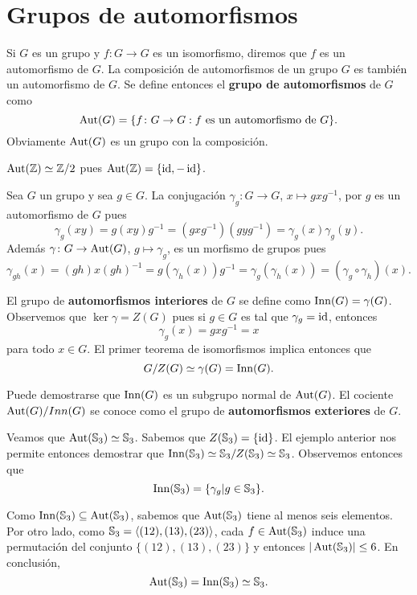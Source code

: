 \chapter{Grupos de automorfismos}

Si $G$ es un grupo y 
$f\colon G\to G$ es un isomorfismo, diremos que $f$ es un automorfismo de $G$. 
La composición de automorfismos de un grupo $G$ es también un automorfismo de $G$. 
Se define entonces el \textbf{grupo de automorfismos} de $G$ como
\[
\operatorname{Aut}(G)=\{f\colon G\to G:f\text{ es un automorfismo de $G$}\}.
\] 
Obviamente $\operatorname{Aut}(G)$ es un grupo con la composición. 

\begin{example}
$\operatorname{Aut}(\mathbb{Z})\simeq\mathbb{Z}/2$ pues $\operatorname{Aut}(\mathbb{Z})=\{\operatorname{id},-\operatorname{id}\}$. 
\end{example}

\begin{example}
Sea $G$ un grupo y sea $g\in G$. La conjugación 
$\gamma_g\colon G\to G$, $x\mapsto gxg^{-1}$, 
por $g$ es un automorfismo de $G$ pues
\[
\gamma_g(xy)=g(xy)g^{-1}=(gxg^{-1})(gyg^{-1})=\gamma_g(x)\gamma_g(y).
\]
Además $\gamma\colon G\to\operatorname{Aut}(G)$, $g\mapsto\gamma_g$, es un morfismo de grupos pues
\[
\gamma_{gh}(x)=(gh)x(gh)^{-1}=g(\gamma_h(x))g^{-1}=\gamma_g(\gamma_h(x))=(\gamma_g\circ\gamma_h)(x).
\]

El grupo de \textbf{automorfismos interiores} de $G$ se define como 
$\mathrm{Inn}(G)=\gamma(G)$. Observemos que $\ker\gamma=Z(G)$ pues
si $g\in G$ es tal que $\gamma_g=\operatorname{id}$, entonces 
\[
\gamma_g(x)=gxg^{-1}=x
\]
para todo $x\in G$. El primer teorema de isomorfismos implica entonces que
\[
G/Z(G)\simeq \gamma(G)=\mathrm{Inn}(G).
\]
\end{example}

Puede demostrarse que $\mathrm{Inn}(G)$ es un subgrupo normal de $\operatorname{Aut}(G)$. El cociente $\operatorname{Aut}(G)/Inn(G)$ se conoce como el grupo de \textbf{automorfismos exteriores} de $G$. 

\begin{example}
Veamos que $\operatorname{Aut}(\mathbb{S}_3)\simeq\mathbb{S}_3$. Sabemos que $Z(\mathbb{S}_3)=\{\operatorname{id}\}$. El ejemplo anterior nos permite entonces demostrar que
$\mathrm{Inn}(\mathbb{S}_3)\simeq\mathbb{S}_3/Z(\mathbb{S}_3)\simeq\mathbb{S}_3$. Observemos entonces que 
\[
\mathrm{Inn}(\mathbb{S}_3)=\{\gamma_g|g\in\mathbb{S}_3\}.
\]

Como $\mathrm{Inn}(\mathbb{S}_3)\subseteq\operatorname{Aut}(\mathbb{S}_3)$, sabemos que $\operatorname{Aut}(\mathbb{S}_3)$ tiene al menos seis elementos.
Por otro lado, como $\mathbb{S}_3=\langle (12),(13),(23)\rangle$, cada $f\in\operatorname{Aut}(\mathbb{S}_3)$ induce una permutación del conjunto $\{(12),(13),(23)\}$ y entonces $|\operatorname{Aut}(\mathbb{S}_3)|\leq6$. En conclusión,
\[
\operatorname{Aut}(\mathbb{S}_3)=\mathrm{Inn}(\mathbb{S}_3)\simeq\mathbb{S}_3.
\]   
\end{example}

